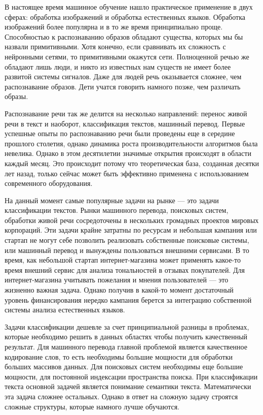 \label{sec:intro}

В настоящее время машинное обучение нашло практическое применение в двух сферах: обработка изображений и обработка естественных языков. Обработка изображений более популярна и в то же время принципиально проще. Способностью к распознаванию образов обладают существа, которых мы бы назвали примитивными. Хотя конечно, если сравнивать их сложность с нейронными сетями, то примитивными окажутся сети. Полноценной речью же обладают лишь люди, и никто из известных нам существ не имеет более развитой системы сигналов. Даже для людей речь оказывается сложнее, чем распознавание образов. Дети учатся говорить намного позже, чем различать образы.

Распознавание речи так же делится на несколько направлений: перенос живой речи в текст и наоборот, классификация текстов, машинный перевод. Первые успешные опыты по распознаванию речи были проведены еще в середине прошлого столетия, однако динамика роста производительности алгоритмов была невелика. Однако в этом десятилетии значимые открытия происходят в области каждый месяц. Это происходит потому что теоретическая база, созданная десятки лет назад, только сейчас может быть эффективно применена с использованием современного оборудования.

На данный момент самые популярные задачи на рынке --- это задачи классификации текстов. Рынки машинного перевода, поисковых систем, обработки живой речи сосредоточены в нескольких громадных проектов мировых корпораций. Эти задачи крайне затратны по ресурсам и небольшая кампания или стартап не могут себе позволить реализовать собственные поисковые системы, или машинный перевод и вынуждены пользоваться внешними сервисами. В то время, как небольшой стартап интернет-магазина может применять какое-то время внешний сервис для анализа тональностей в отзывах покупателей. Для интернет-магазина учитывать пожелания и мнения пользователей --- это жизненно важная задача. Однако получив в какой-то момент достаточный уровень финансирования нередко кампания берется за интеграцию собственной системы анализа естественных языков.

Задачи классификации дешевле за счет принципиальной разницы в проблемах, которые необходимо решить в данных областях чтобы получить качественный результат. Для машинного перевода главной проблемой является качественное кодирование слов, то есть необходимы большие мощности для обработки больших массивов данных. Для поисковых систем необходимы еще большие мощности, для постоянной индексации пространства поиска. При классификации текста основной задачей является понимание семантики текста. Математически эта задача сложнее остальных. Однако в ответ на сложную задачу строятся сложные структуры, которые намного лучше обучаются.


